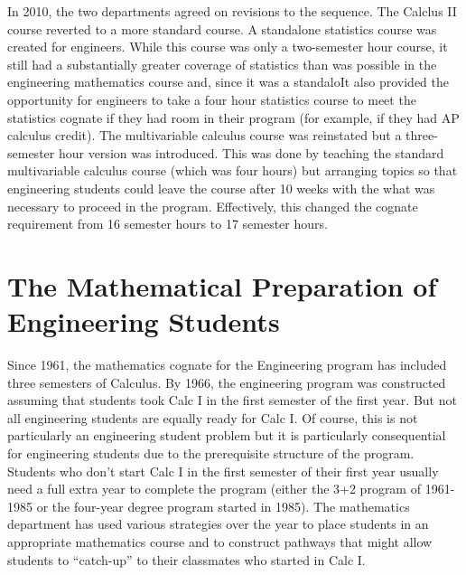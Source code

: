 \documentclass[
]{book}
\begin{document}
In 2010, the two departments agreed on revisions to the sequence. The Calclus II course reverted to a more standard course. A standalone statistics course was created for engineers. While this course was only a two-semester hour course, it still had a substantially greater coverage of statistics than was possible in the engineering mathematics course and, since it was a standaloIt also provided the opportunity for engineers to take a four hour statistics course to meet the statistics cognate if they had room in their program (for example, if they had AP calculus credit). The multivariable calculus course was reinstated but a three-semester hour version was introduced. This was done by teaching the standard multivariable calculus course (which was four hours) but arranging topics so that engineering students could leave the course after 10 weeks with the what was necessary to proceed in the program. Effectively, this changed the cognate requirement from 16 semester hours to 17 semester hours.

\hypertarget{the-mathematical-preparation-of-engineering-students}{%
\section{The Mathematical Preparation of Engineering Students}\label{the-mathematical-preparation-of-engineering-students}}

Since 1961, the mathematics cognate for the Engineering program has included three semesters of Calculus. By 1966, the engineering program was constructed assuming that students took Calc I in the first semester of the first year. But not all engineering students are equally ready for Calc I. Of course, this is not particularly an engineering student problem but it is particularly consequential for engineering students due to the prerequisite structure of the program. Students who don't start Calc I in the first semester of their first year usually need a full extra year to complete the program (either the 3+2 program of 1961-1985 or the four-year degree program started in 1985). The mathematics department has used various strategies over the year to place students in an appropriate mathematics course and to construct pathways that might allow students to ``catch-up'' to their classmates who started in Calc I.
\end{document}
